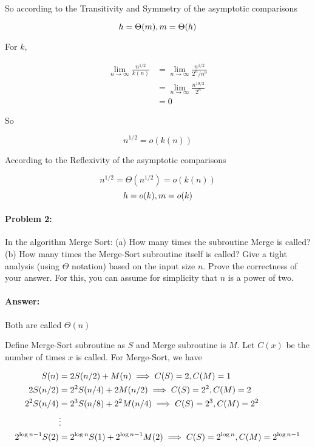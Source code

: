 \documentclass{article}
\begin{document}
So according to the Transitivity and Symmetry of the asymptotic comparisons

$$ h = \Theta(m),\space m = \Theta(h) $$

For $k$,

$$\begin{aligned}
\lim\limits_{n\rightarrow\infty}\frac{n^{1/2}}{k(n)}&=\lim\limits_{n\rightarrow\infty}\frac{n^{1/2}}{2^n/n^9}\\
&=\lim\limits_{n\rightarrow\infty}\frac{n^{19/2}}{2^n}\\
&=0
\end{aligned}$$

So

$$ n^{1/2}=o(k(n)) $$

According to the Reflexivity of the asymptotic comparisons

$$ n^{1/2}=\Theta(n^{1/2})=o(k(n)) $$
$$ h=o(k), \space m=o(k) $$

\newpage
\paragraph{Problem 2:} 
In the algorithm Merge Sort: (a) How many times the subroutine Merge is called? (b) How many times the Merge-Sort subroutine itself is called? Give a tight analysis (using $\Theta$ notation) based on the input size $n$. Prove the correctness of your answer. For this, you can assume for simplicity that $n$ is a power of two.



\paragraph{Answer:}

Both are called $\Theta(n)$

Define Merge-Sort subroutine as $S$ and Merge subroutine is $M$. Let $C(x)$ be the number of times $x$ is called. For Merge-Sort, we have

$$\begin{aligned}
S(n)&=2S(n/2)+M(n) \space\implies\space C(S)=2, C(M)=1\\
2S(n/2)&=2^2S(n/4)+2M(n/2) \space\implies\space C(S)=2^2, C(M)=2\\
2^2S(n/4)&=2^3S(n/8)+2^2M(n/4) \space\implies\space C(S)=2^3, C(M)=2^2\\
&\vdots\\
2^{{\log n}-1}S(2)&=2^{\log n}S(1)+2^{{\log n}-1}M(2) \space\implies\space C(S)=2^{\log n}, C(M)=2^{{\log n}-1}
\end{aligned}$$
\end{document}
